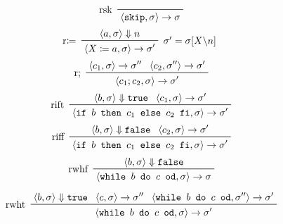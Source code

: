 				\begin{multicols}{2}
					\begin{equation*}
						\prftree[l]
						{ rsk }
						{ \langle \texttt{skip}, \sigma \rangle \rightarrow \sigma }
					\end{equation*}
					\begin{equation*}
						\prftree[l, r]
						{ $ \sigma' = \sigma[X \backslash n] $ }
						{ r$ \coloneqq $ }
						{ \langle a, \sigma \rangle \Downarrow n }
						{ \langle X \coloneqq a, \sigma \rangle \rightarrow \sigma' }
					\end{equation*}
					\begin{equation*}
						\prftree[l]
						{ r; }
						{ \langle c _ 1, \sigma \rangle \rightarrow \sigma'' }
						{ \langle c _ 2, \sigma'' \rangle \rightarrow \sigma' }
						{ \langle c _ 1 ; c _ 2, \sigma \rangle \rightarrow \sigma' }
					\end{equation*}
					\begin{equation*}
						\prftree[l]
						{ rift }
						{ \langle b, \sigma \rangle \Downarrow \texttt{true} }
						{ \langle c _ 1, \sigma \rangle \rightarrow \sigma' }
						{ \langle \texttt{if } b \texttt{ then } c _ 1 \texttt{ else } c _ 2 \texttt{ fi}, \sigma \rangle \rightarrow \sigma' }
					\end{equation*}
					\begin{equation*}
						\prftree[l]
						{ riff }
						{ \langle b, \sigma \rangle \Downarrow \texttt{false} }
						{ \langle c _ 2, \sigma \rangle \rightarrow \sigma' }
						{ \langle \texttt{if } b \texttt{ then } c _ 1 \texttt{ else } c _ 2 \texttt{ fi}, \sigma \rangle \rightarrow \sigma' }
					\end{equation*}
					\begin{equation*}
						\prftree[l]
						{ rwhf }
						{ \langle b, \sigma \rangle \Downarrow \texttt{false} }
						{ \langle \texttt{while } b \texttt{ do } c \texttt{ od}, \sigma \rangle \rightarrow \sigma }
					\end{equation*}
				\end{multicols}
				\vspace{-0.4cm}
				\begin{equation*}
					\prftree[l]
					{ rwht }
					{ \langle b, \sigma \rangle \Downarrow \texttt{true} }
					{ \langle c, \sigma \rangle \rightarrow \sigma'' }
					{ \langle \texttt{while } b \texttt{ do } c \texttt{ od}, \sigma'' \rangle \rightarrow \sigma' }
					{ \langle \texttt{while } b \texttt{ do } c \texttt{ od}, \sigma \rangle \rightarrow \sigma' }
				\end{equation*}

